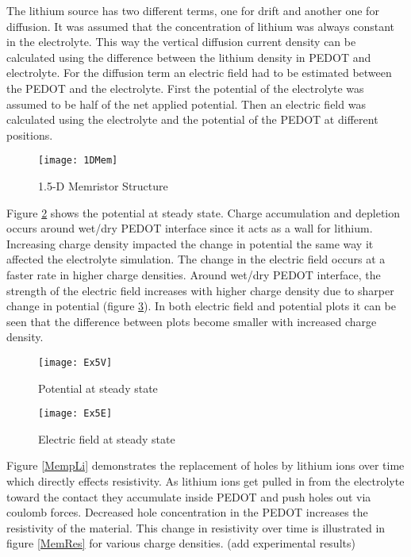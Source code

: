 The lithium source has two different terms, one for drift and another one for diffusion. It was assumed that the concentration of lithium was always constant in the electrolyte. This way the vertical diffusion current density can be calculated using the difference between the lithium density in PEDOT and electrolyte. For the diffusion term an electric field had to be estimated between the PEDOT and the electrolyte. First the potential of the electrolyte was assumed to be half of the net applied potential. Then an electric field was calculated using the electrolyte and the potential of the PEDOT at different positions.
  
\begin{figure}[!htp]
\centering
\texttt{[image: 1DMem]}
\caption{1.5-D Memristor Structure} 
\label{MemStc15}
\end{figure}

Figure \ref{MemVss} shows the potential at steady state. Charge accumulation and depletion occurs around wet/dry PEDOT interface since it acts as a wall for lithium. Increasing charge density impacted the change in potential the same way it affected the electrolyte simulation. The change in the electric field occurs at a faster rate in higher charge densities. Around wet/dry PEDOT interface, the strength of the electric field increases with higher charge density due to sharper change in potential (figure \ref{MemEss}). In both electric field and potential plots it can be seen that the difference between plots become smaller with increased charge density.   

\begin{figure}[!htp]
\centering
\texttt{[image: Ex5V]}
\caption{Potential at steady state} 
\label{MemVss}
\end{figure}

\begin{figure}[!htp]
\centering
\texttt{[image: Ex5E]}
\caption{Electric field at steady state} 
\label{MemEss}
\end{figure}

Figure \ref{MempLi} demonstrates the replacement of holes by lithium ions over time which directly effects resistivity. As lithium ions get pulled in from the electrolyte toward the contact they accumulate inside PEDOT and push holes out via coulomb forces. Decreased hole concentration in the PEDOT increases the resistivity of the material. This change in resistivity over time is illustrated in figure \ref{MemRes} for various charge densities. (add experimental results)

